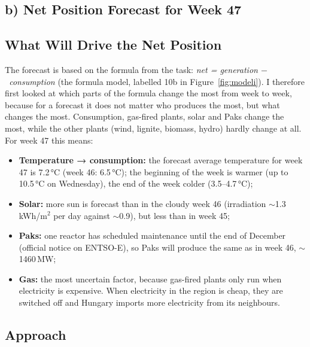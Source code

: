 \documentclass[10pt,a4paper]{article}
\newcommand{\m}{$-$}
\begin{document}
\subsection*{b) Net Position Forecast for Week 47}

\subsection*{What Will Drive the Net Position}

The forecast is based on the formula from the task: \emph{net = generation \m\ consumption} (the formula model,
labelled 10b in Figure~\ref{fig:modeli}). I therefore first looked at which parts of the formula change the most
from week to week, because for a forecast it does not matter who produces the most, but what changes the most.
Consumption, gas-fired plants, solar and Paks change the most, while the other plants (wind, lignite, biomass,
hydro) hardly change at all. For week 47 this means:
\begin{itemize}\setlength\itemsep{1pt}
\item \textbf{Temperature → consumption:} the forecast average temperature for week 47 is 7.2\,°C (week 46:
6.5\,°C); the beginning of the week is warmer (up to 10.5\,°C on Wednesday), the end of the week colder
(3.5–4.7\,°C);
\item \textbf{Solar:} more sun is forecast than in the cloudy week 46 (irradiation $\sim$1.3\,kWh/m$^2$ per day
against $\sim$0.9), but less than in week 45;
\item \textbf{Paks:} one reactor has scheduled maintenance until the end of December (official notice on
ENTSO-E), so Paks will produce the same as in week 46, $\sim$1460\,MW;
\item \textbf{Gas:} the most uncertain factor, because gas-fired plants only run when electricity is expensive.
When electricity in the region is cheap, they are switched off and Hungary imports more electricity from its
neighbours.
\end{itemize}

\subsection*{Approach}
\end{document}

